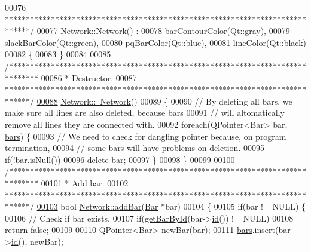 \begin{DoxyCode}
00076 \textcolor{comment}{ ******************************************************************************/}
\hypertarget{network_8cpp_source_l00077}{}\hyperlink{group___models_ga3cc2fb4f8fa4d507077e8da85ce5a1c8}{00077} \hyperlink{group___models_ga3cc2fb4f8fa4d507077e8da85ce5a1c8}{Network::Network}() :
00078   barContourColor(Qt::gray),
00079   slackBarColor(Qt::green),
00080   pqBarColor(Qt::blue),
00081   lineColor(Qt::black)
00082 \{
00083 \}
00084 
00085 \textcolor{comment}{/*******************************************************************************}
00086 \textcolor{comment}{ * Destructor.}
00087 \textcolor{comment}{ ******************************************************************************/}
\hypertarget{network_8cpp_source_l00088}{}\hyperlink{group___models_ga7a4e19cdb4bf0c7ecf82baa643831492}{00088} \hyperlink{group___models_ga7a4e19cdb4bf0c7ecf82baa643831492}{Network::~Network}()
00089 \{
00090   \textcolor{comment}{// By deleting all bars, we make sure all lines are also deleted, because bars}
00091   \textcolor{comment}{// will altomatically remove all lines they are connected with.}
00092   \textcolor{keywordflow}{foreach}(QPointer<Bar> bar, \hyperlink{class_network_ae37a8418e42adf765b143cdc9d992b6c}{bars}) \{
00093     \textcolor{comment}{// We need to check for dangling pointer because, on program termination,}
00094     \textcolor{comment}{// some bars will have problems on deletion.}
00095     \textcolor{keywordflow}{if}(!bar.isNull())
00096       \textcolor{keyword}{delete} bar;
00097   \}
00098 \}
00099 
00100 \textcolor{comment}{/*******************************************************************************}
00101 \textcolor{comment}{ * Add bar.}
00102 \textcolor{comment}{ ******************************************************************************/}
\hypertarget{network_8cpp_source_l00103}{}\hyperlink{group___models_ga8c5dfef0216731246f7411e1a5fbee01}{00103} \textcolor{keywordtype}{bool} \hyperlink{group___models_ga8c5dfef0216731246f7411e1a5fbee01}{Network::addBar}(\hyperlink{class_bar}{Bar} *bar)
00104 \{
00105   \textcolor{keywordflow}{if}(bar != NULL) \{
00106     \textcolor{comment}{// Check if bar exists.}
00107     \textcolor{keywordflow}{if}(\hyperlink{group___models_ga04d524ce0fa0dd0d06deda92b1597af0}{getBarById}(bar->\hyperlink{group___models_gacf0fb781a73856bb7beb823304465e13}{id}()) != NULL)
00108       \textcolor{keywordflow}{return} \textcolor{keyword}{false};
00109 
00110     QPointer<Bar> newBar(bar);
00111     \hyperlink{class_network_ae37a8418e42adf765b143cdc9d992b6c}{bars}.insert(bar->\hyperlink{group___models_gacf0fb781a73856bb7beb823304465e13}{id}(), newBar);

\end{DoxyCode}
